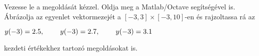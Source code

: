 Vezesse le a 
\de{} megoldását kézzel. 
Oldja meg a Matlab/Octave   segítségével is. 
Ábrázolja az egyenlet vektormezejét a $[-3,3]\times [-3,10]$-en és 
rajzoltassa rá az 
\centerline{$y(-3)=2.5, \hspace{0.8cm} y(-3)=2.7, \hspace{0.8cm} y(-3)=3.1$}
kezdeti értékekhez tartozó megoldásokat is.


